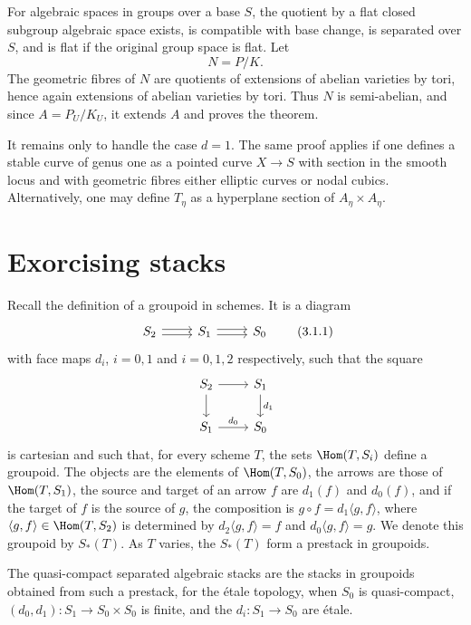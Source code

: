 For algebraic spaces in groups over a base $S$, the quotient by a flat closed subgroup algebraic space exists, is compatible with base change, is separated over $S$, and is flat if the original group space is flat. Let
\[
  N=P/K.
\]
The geometric fibres of $N$ are quotients of extensions of abelian varieties by tori, hence again extensions of abelian varieties by tori. Thus $N$ is semi-abelian, and since $A=P_U/K_U$, it extends $A$ and proves the theorem.

It remains only to handle the case $d=1$. The same proof applies if one defines a stable curve of genus one as a pointed curve $X\to S$ with section in the smooth locus and with geometric fibres either elliptic curves or nodal cubics. Alternatively, one may define $T_\eta$ as a hyperplane section of $A_\eta\times A_\eta$.

\section{Exorcising stacks}

Recall the definition of a groupoid in schemes. It is a diagram
\[
\begin{tikzcd}
S_2 \arrow[r,shift left=.5ex] \arrow[r,shift right=.5ex] & S_1 \arrow[r,shift left=.5ex] \arrow[r,shift right=.5ex] & S_0
\end{tikzcd}
\tag{3.1.1}
\]
with face maps $d_i$, $i=0,1$ and $i=0,1,2$ respectively, such that the square
\[
\begin{tikzcd}
S_2 \arrow[r] \arrow[d] & S_1 \arrow[d,"d_1"]\\
S_1 \arrow[r,"d_0"] & S_0
\end{tikzcd}
\]
is cartesian and such that, for every scheme $T$, the sets $\Hom(T,S_i)$ define a groupoid. The objects are the elements of $\Hom(T,S_0)$, the arrows are those of $\Hom(T,S_1)$, the source and target of an arrow $f$ are $d_1(f)$ and $d_0(f)$, and if the target of $f$ is the source of $g$, the composition is $g\circ f=d_1\langle g,f\rangle$, where $\langle g,f\rangle\in\Hom(T,S_2)$ is determined by $d_2\langle g,f\rangle=f$ and $d_0\langle g,f\rangle=g$. We denote this groupoid by $S_*(T)$. As $T$ varies, the $S_*(T)$ form a prestack in groupoids.

The quasi-compact separated algebraic stacks are the stacks in groupoids obtained from such a prestack, for the étale topology, when $S_0$ is quasi-compact, $(d_0,d_1):S_1\to S_0\times S_0$ is finite, and the $d_i:S_1\to S_0$ are étale.

